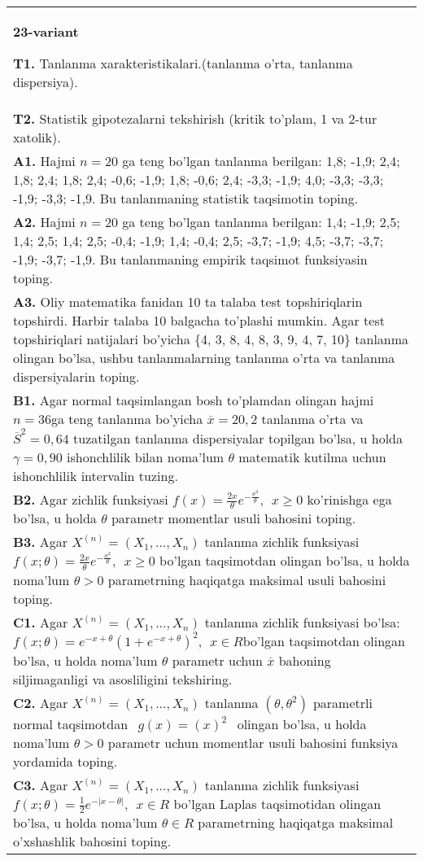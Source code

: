 \documentclass{article}
\begin{document}
\begin{tabular}{m{17cm}}
\textbf{23-variant}
\newline

\textbf{T1.} 
Tanlanma xarakteristikalari.(tanlanma o'rta, tanlanma dispersiya).
\\
\textbf{T2.} 
Statistik gipotezalarni tekshirish (kritik to'plam, 1 va 2-tur xatolik).
\\
\textbf{A1.} 
Hajmi \(n = 20\) ga teng bo'lgan tanlanma berilgan: 1,8; -1,9; 2,4; 1,8; 2,4; 1,8; 2,4; -0,6; -1,9; 1,8; -0,6; 2,4; -3,3; -1,9; 4,0; -3,3; -3,3; -1,9; -3,3; -1,9. Bu tanlanmaning statistik taqsimotin toping.
\\
\textbf{A2.} 
Hajmi \(n = 20\) ga teng bo'lgan tanlanma berilgan: 1,4; -1,9; 2,5; 1,4; 2,5; 1,4; 2,5; -0,4; -1,9; 1,4; -0,4; 2,5; -3,7; -1,9; 4,5; -3,7; -3,7; -1,9; -3,7; -1,9. Bu tanlanmaning empirik taqsimot funksiyasin toping.
\\
\textbf{A3.} 
Oliy matematika fanidan 10 ta talaba test topshiriqlarin topshirdi. Harbir talaba 10 balgacha to'plashi mumkin. Agar test topshiriqlari natijalari bo'yicha \{4, 3, 8, 4, 8, 3, 9, 4, 7, 10\} tanlanma olingan bo'lsa, ushbu tanlanmalarning tanlanma o'rta va tanlanma dispersiyalarin toping.
\\
\textbf{B1.} 
Agar normal taqsimlangan bosh to'plamdan olingan hajmi \(n = 36\)ga teng tanlanma bo'yicha \(\overline{x} = 20,2\) tanlanma o'rta va \({\overline{S}}^{2} = 0,64\) tuzatilgan tanlanma dispersiyalar topilgan bo'lsa, u holda \(\gamma = 0,90\) ishonchlilik bilan noma'lum \(\theta\) matematik kutilma uchun ishonchlilik intervalin tuzing.
\\
\textbf{B2.} 
Agar zichlik funksiyasi \(f(x) = \frac{2x}{\theta}e^{- \frac{x^{2}}{\theta}},\ \ x \geq 0\) ko'rinishga ega bo'lsa, u holda \(\theta\) parametr momentlar usuli bahosini toping.
\\
\textbf{B3.} 
Agar \(X^{(n)} = \left( X_{1},...,X_{n} \right)\) tanlanma zichlik funksiyasi \(f(x;\theta) = \frac{2x}{\theta}e^{- \frac{x^{2}}{\theta}},\ \ x \geq 0\) bo'lgan taqsimotdan olingan bo'lsa, u holda noma'lum \(\theta > 0\) parametrning haqiqatga maksimal usuli bahosini toping.
\\
\textbf{C1.} 
Agar \(X^{(n)} = \left( X_{1},...,X_{n} \right)\) tanlanma zichlik funksiyasi bo'lsa: \(f(x;\theta) = e^{- x + \theta}\left( 1 + e^{- x + \theta} \right)^{2},\ \ x \in R\)bo'lgan taqsimotdan olingan bo'lsa, u holda noma'lum \(\theta\) parametr uchun \(\overline{x}\) bahoning siljimaganligi va asosliligini tekshiring.
\\
\textbf{C2.} 
Agar \(X^{(n)} = \left( X_{1},...,X_{n} \right)\) tanlanma \((\theta,\theta^{2})\) parametrli normal taqsimotdan \(\ \ g(x) = (x)^{2}\ \ \) olingan bo'lsa, u holda noma'lum \(\theta > 0\) parametr uchun momentlar usuli bahosini funksiya yordamida toping.
\\
\textbf{C3.} 
Agar \(X^{(n)} = \left( X_{1},...,X_{n} \right)\) tanlanma zichlik funksiyasi\(f(x;\theta) = \frac{1}{2}e^{- |x - \theta|},\ \ x \in R\) bo'lgan Laplas taqsimotidan olingan bo'lsa, u holda noma'lum \(\theta \in R\) parametrning haqiqatga maksimal o'xshashlik bahosini toping.
\\

\end{tabular}
\end{document}
